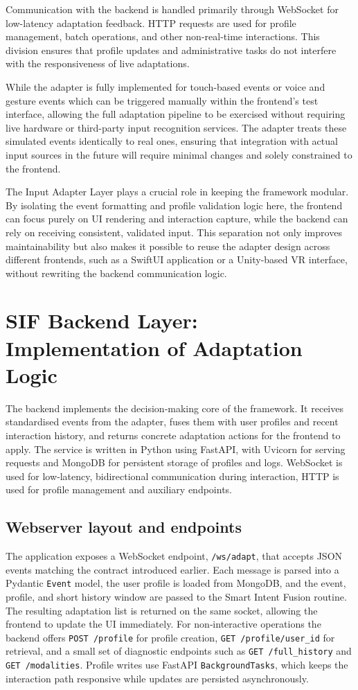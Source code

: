 \documentclass[openany]{book}
\begin{document}
Communication with the backend is handled primarily through WebSocket for low-latency adaptation feedback. HTTP requests are used for profile management, batch operations, and other non-real-time interactions. This division ensures that profile updates and administrative tasks do not interfere with the responsiveness of live adaptations.

While the adapter is fully implemented for touch-based events or voice and gesture events which can be triggered manually within the frontend’s test interface, allowing the full adaptation pipeline to be exercised without requiring live hardware or third-party input recognition services. The adapter treats these simulated events identically to real ones, ensuring that integration with actual input sources in the future will require minimal changes and solely constrained to the frontend.

The Input Adapter Layer plays a crucial role in keeping the framework modular. By isolating the event formatting and profile validation logic here, the frontend can focus purely on UI rendering and interaction capture, while the backend can rely on receiving consistent, validated input. This separation not only improves maintainability but also makes it possible to reuse the adapter design across different frontends, such as a SwiftUI application or a Unity-based VR interface, without rewriting the backend communication logic.

\section{SIF Backend Layer: Implementation of Adaptation Logic}
The backend implements the decision‑making core of the framework. It receives standardised events from the adapter, fuses them with user profiles and recent interaction history, and returns concrete adaptation actions for the frontend to apply. The service is written in Python using FastAPI, with Uvicorn for serving requests and MongoDB for persistent storage of profiles and logs. WebSocket is used for low‑latency, bidirectional communication during interaction, HTTP is used for profile management and auxiliary endpoints.

\subsection{Webserver layout and endpoints}
The application exposes a WebSocket endpoint, \texttt{/ws/adapt}, that accepts JSON events matching the contract introduced earlier. Each message is parsed into a Pydantic \texttt{Event} model, the user profile is loaded from MongoDB, and the event, profile, and short history window are passed to the Smart Intent Fusion routine. The resulting adaptation list is returned on the same socket, allowing the frontend to update the UI immediately. For non‑interactive operations the backend offers \texttt{POST /profile} for profile creation, \texttt{GET /profile/{user\_id}} for retrieval, and a small set of diagnostic endpoints such as \texttt{GET /full\_history} and \texttt{GET /modalities}. Profile writes use FastAPI \texttt{BackgroundTasks}, which keeps the interaction path responsive while updates are persisted asynchronously.
\end{document}
